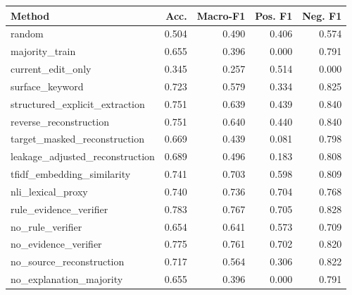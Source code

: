 \begin{tabular}{lrrrr}
\toprule
Method & Acc. & Macro-F1 & Pos. F1 & Neg. F1 \\
\midrule
random & 0.504 & 0.490 & 0.406 & 0.574 \\
majority\_train & 0.655 & 0.396 & 0.000 & 0.791 \\
current\_edit\_only & 0.345 & 0.257 & 0.514 & 0.000 \\
surface\_keyword & 0.723 & 0.579 & 0.334 & 0.825 \\
structured\_explicit\_extraction & 0.751 & 0.639 & 0.439 & 0.840 \\
reverse\_reconstruction & 0.751 & 0.640 & 0.440 & 0.840 \\
target\_masked\_reconstruction & 0.669 & 0.439 & 0.081 & 0.798 \\
leakage\_adjusted\_reconstruction & 0.689 & 0.496 & 0.183 & 0.808 \\
tfidf\_embedding\_similarity & 0.741 & 0.703 & 0.598 & 0.809 \\
nli\_lexical\_proxy & 0.740 & 0.736 & 0.704 & 0.768 \\
rule\_evidence\_verifier & 0.783 & 0.767 & 0.705 & 0.828 \\
no\_rule\_verifier & 0.654 & 0.641 & 0.573 & 0.709 \\
no\_evidence\_verifier & 0.775 & 0.761 & 0.702 & 0.820 \\
no\_source\_reconstruction & 0.717 & 0.564 & 0.306 & 0.822 \\
no\_explanation\_majority & 0.655 & 0.396 & 0.000 & 0.791 \\
\bottomrule
\end{tabular}
